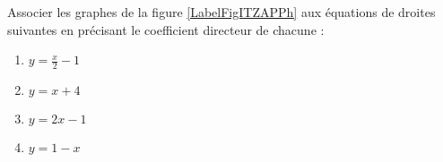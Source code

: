 
\begin{exercice}\label{exosmath-0395}

    Associer les graphes de la figure \ref{LabelFigITZAPPh} aux équations de droites suivantes en précisant le coefficient directeur de chacune :
    \begin{multicols}{2}
        \begin{enumerate}
            \item
                \( y=\frac{ x }{ 2 }-1\)
            \item
                \( y=x+4\)
            \item
                \( y=2x-1\)
            \item
                \( y=1-x\)
        \end{enumerate}
    \end{multicols}
    
\newcommand{\CaptionFigITZAPPh}{Les graphes de l'exercice \ref{exosmath-0395}.}


\end{exercice}

